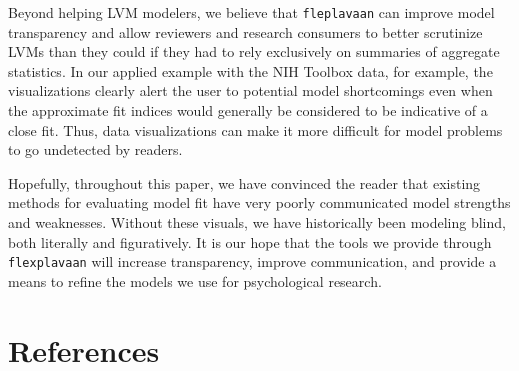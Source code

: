 \documentclass[
  english,
  doc]{apa6}
\begin{document}
Beyond helping LVM modelers, we believe that \texttt{fleplavaan} can improve model transparency and allow reviewers and research consumers to better scrutinize LVMs than they could if they had to rely exclusively on summaries of aggregate statistics. In our applied example with the NIH Toolbox data, for example, the visualizations clearly alert the user to potential model shortcomings even when the approximate fit indices would generally be considered to be indicative of a close fit. Thus, data visualizations can make it more difficult for model problems to go undetected by readers.

Hopefully, throughout this paper, we have convinced the reader that existing methods for evaluating model fit have very poorly communicated model strengths and weaknesses. Without these visuals, we have historically been modeling blind, both literally and figuratively. It is our hope that the tools we provide through \texttt{flexplavaan} will increase transparency, improve communication, and provide a means to refine the models we use for psychological research.

\hypertarget{references}{%
\section*{References}\label{references}}
\end{document}
